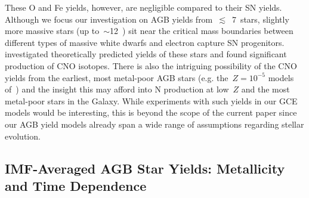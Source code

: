 \documentclass[ms.tex]{subfiles}
\begin{document}
These O and Fe yields, however, are negligible compared to their SN yields.
Although we focus our investigation on AGB yields from~$\lesssim$~7~\msun stars,
slightly more massive stars (up to~$\sim$12~\msun) sit near the critical mass
boundaries between different types of massive white dwarfs and electron capture
SN progenitors.
\citet{Doherty2017} investigated theoretically predicted yields of these stars
and found significant production of CNO isotopes.
There is also the intriguing possibility of the CNO yields from the earliest,
most metal-poor AGB stars (e.g. the~$Z = 10^{-5}$ models
of~\citealp{Gil-Pons2013, Gil-Pons2021}) and the insight this may afford into
N production at low~$Z$ and the most metal-poor stars in the Galaxy.
While experiments with such yields in our GCE models would be interesting, this
is beyond the scope of the current paper since our AGB yield models already
span a wide range of assumptions regarding stellar evolution.



\subsection{IMF-Averaged AGB Star Yields: Metallicity and Time Dependence}
\label{sec:yields:imf_agb}
\end{document}
